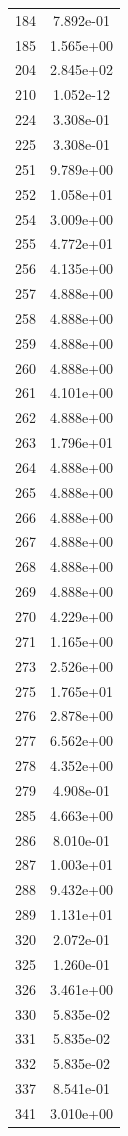 \documentclass[12pt]{article}
\begin{document}
\begin{longtable}{@{}cc@{}}
184 & 7.892e-01 \\
185 & 1.565e+00 \\
204 & 2.845e+02 \\
210 & 1.052e-12 \\
224 & 3.308e-01 \\
225 & 3.308e-01 \\
251 & 9.789e+00 \\
252 & 1.058e+01 \\
254 & 3.009e+00 \\
255 & 4.772e+01 \\
256 & 4.135e+00 \\
257 & 4.888e+00 \\
258 & 4.888e+00 \\
259 & 4.888e+00 \\
260 & 4.888e+00 \\
261 & 4.101e+00 \\
262 & 4.888e+00 \\
263 & 1.796e+01 \\
264 & 4.888e+00 \\
265 & 4.888e+00 \\
266 & 4.888e+00 \\
267 & 4.888e+00 \\
268 & 4.888e+00 \\
269 & 4.888e+00 \\
270 & 4.229e+00 \\
271 & 1.165e+00 \\
273 & 2.526e+00 \\
275 & 1.765e+01 \\
276 & 2.878e+00 \\
277 & 6.562e+00 \\
278 & 4.352e+00 \\
279 & 4.908e-01 \\
285 & 4.663e+00 \\
286 & 8.010e-01 \\
287 & 1.003e+01 \\
288 & 9.432e+00 \\
289 & 1.131e+01 \\
320 & 2.072e-01 \\
325 & 1.260e-01 \\
326 & 3.461e+00 \\
330 & 5.835e-02 \\
331 & 5.835e-02 \\
332 & 5.835e-02 \\
337 & 8.541e-01 \\
341 & 3.010e+00 \\

\end{longtable}
\end{document}
